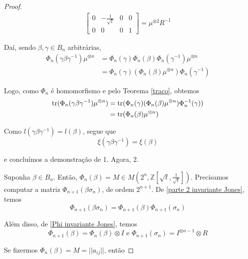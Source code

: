 \begin{proof}
\begin{align*}
\begin{bmatrix}
		0 & -\frac{1}{\sqrt{t}} & 0 & 0 \\
		0 & 0 & 0 & 1
		\end{bmatrix} = \mu^{\otimes 2}R^{-1}
		\end{align*}
		\par\vspace{0.3cm} Daí, sendo $\beta, \gamma\in B_n$ arbitrárias, 
		\begin{align*}
		\Phi_n(\gamma\beta\gamma^{-1}) \mu^{\otimes n} &= \Phi_n(\gamma)\Phi_n(\beta)\Phi_n(\gamma^{-1})\mu^{\otimes n} \\
		&= \Phi_n(\gamma)(\Phi_n(\beta)\mu^{\otimes n})\Phi_n(\gamma^{-1})
		\end{align*}
		\par\vspace{0.3cm} Logo, como $\Phi_n$ é homomorfismo e pelo Teorema \eqref{traco}, obtemos
		\begin{align*}
		\operatorname{tr}(\Phi_n(\gamma\beta\gamma^{-1}) \mu^{\otimes n})	&= \operatorname{tr}(\Phi_n(\gamma)(\Phi_n(\beta)\mu^{\otimes n})\Phi_n^{-1}(\gamma)) \\
		&= \operatorname{tr}(\Phi_n(\beta)\mu^{\otimes n})
		\end{align*}
		\par\vspace{0.3cm} Como $l(\gamma\beta\gamma^{-1}) = l(\beta)$, segue que
		\begin{equation*}
		\xi(\gamma\beta\gamma^{-1}) = \xi(\beta)
		\end{equation*}
		\par\vspace{0.3cm} e concluímos a demonstração de 1. Agora, 2.
		\par\vspace{0.3cm} Suponha $\beta\in B_n$. Então, $\Phi_n(\beta) = M\in M(2^n, \mathbb{Z}[\sqrt{t}, \frac{1}{\sqrt{t}}])$. Precisamos computar a matriz $\Phi_{n+1}(\beta\sigma_n)$, de ordem $2^{n+1}$. De \eqref{parte 2 invariante Jones}, temos
		\begin{equation*}
		\Phi_{n+1}(\beta\sigma_n) = \Phi_{n+1}(\beta)\Phi_{n+1}(\sigma_n)
		\end{equation*}
		\par\vspace{0.3cm} Além disso, de \eqref{Phi invariante Jones}, temos
		\begin{equation*}
		\Phi_{n+1}(\beta) = \Phi_n(\beta)\otimes I \text{ e }\Phi_{n+1}(\sigma_n) = I^{\otimes n-1}\otimes R
		\end{equation*}
		\par\vspace{0.3cm} Se fizermos $\Phi_n(\beta) = M = ||a_{ij}||$, então

\end{proof}
